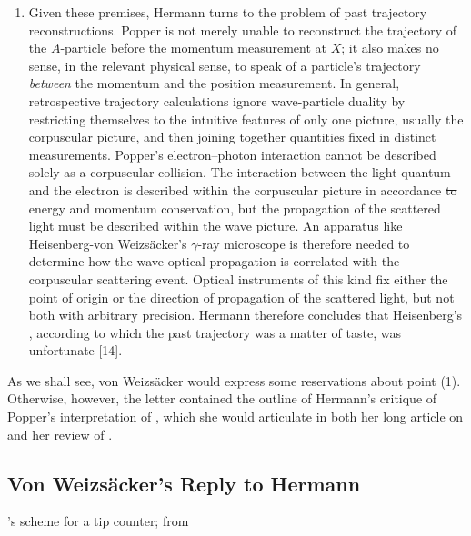 \documentclass[pdflatex]{sn-jnl}
\renewcommand{\cite}{\citealp}
\newcommand{\LdF}{\bt{Logik der Forschung}\xspace}
\newcommand{\vW}{von Weizsäcker\xspace}
\newcommand{\VW}{Von Weizsäcker\xspace}
\providecommand{\DIFadd}[1]{{\protect\color{blue}\uwave{#1}}} %
\providecommand{\DIFdel}[1]{{\protect\color{red}\sout{#1}}}                      %
\providecommand{\DIFaddbegin}{} %
\providecommand{\DIFaddend}{} %
\providecommand{\DIFdelbegin}{} %
\providecommand{\DIFdelend}{} %
\begin{document}
\begin{enumerate}
\item Given these premises, Hermann turns to the problem of past trajectory reconstructions. Popper is not merely unable to reconstruct the trajectory of the $A$-particle before the momentum measurement at $X$; it also makes no sense, in the relevant physical sense, to speak of a particle's trajectory \emph{between} the momentum and the position measurement. In general, retrospective trajectory calculations ignore wave-particle duality by restricting themselves to the intuitive features of only one picture, usually the corpuscular picture, and then joining together quantities fixed in distinct measurements. Popper's electron--photon interaction cannot be described solely as a corpuscular collision. The interaction between the light quantum and the electron is described within the corpuscular picture in accordance \DIFdelbegin \DIFdel{to }\DIFdelend \DIFaddbegin \DIFadd{with }\DIFaddend energy and momentum conservation, but the propagation of the scattered light must be described within the wave picture. An apparatus like Heisenberg-\vW's $\gamma$-ray microscope is therefore needed to determine how the wave-optical propagation is correlated with the corpuscular scattering event. Optical instruments of this kind fix either the point of origin or the direction of propagation of the scattered light, but not both with arbitrary precision. Hermann therefore concludes that Heisenberg’s , according to which the past trajectory was a matter of taste, was unfortunate [14].
\end{enumerate}
%
As we shall see, \vW would express some reservations about point (1). Otherwise, however, the letter contained the outline of Hermann's critique of Popper's interpretation of \qm, which she would articulate in both her long article on \qm \citep{Hermann1935} and her review of \LdF \citep{Hermann1935a}.

\subsection{\VW's Reply to Hermann}


\DIFdelbegin %
{%
\DIFdel{'s scheme for a tip counter; from \mbox{%
\cite[485]{Herrmann2019}}\hskip0pt%
}%
}
\end{document}
